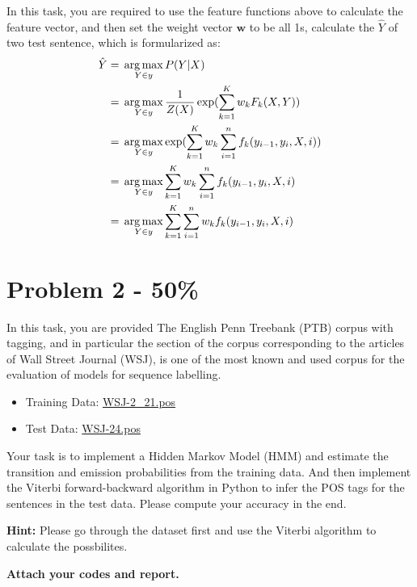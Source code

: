 \documentclass{article}
\begin{document}
In this task, you are required to use the feature functions above to calculate the feature vector,
and then set the weight vector $\mathbf{w}$ to be all 1s,
calculate the $\hat{Y}$ of two test sentence, which is formularized as:
\begin{align}
\hat{Y} &= \sideset{}{}{\arg\max}_{Y \in y}  P(Y|X) \\ &= \sideset{}{}{\arg\max}_{Y \in y} \frac{1}{Z(X)}\exp (\sum_{k = 1}^{K}w_kF_k(X,Y) ) \\ & = \sideset{}{}{\arg\max}_{Y \in y} \exp (\sum_{k = 1}^{K}w_k\sum_{i = 1}^{n}f_k(y_{i-1},y_i,X,i)) \\ & = \sideset{}{}{\arg\max}_{Y \in y} \sum_{k = 1}^{K}w_k\sum_{i = 1}^{n}f_k(y_{i-1},y_i,X,i) \\ & = \sideset{}{}{\arg\max}_{Y \in y} \sum_{k = 1}^{K}\sum_{i = 1}^{n}w_kf_k(y_{i-1},y_i,X,i) 
\end{align}


\section*{Problem 2 - 50\%}

In this task, you are provided The English Penn Treebank (PTB) corpus with tagging, 
and in particular the section of the corpus corresponding 
to the articles of Wall Street Journal (WSJ), 
is one of the most known and used corpus for the evaluation of models for sequence labelling.

\begin{itemize}
    \item Training Data: \href{https://drive.google.com/file/d/16H4D4nsntZVA4sXslWAy2nl8BX_gxofM/view?usp=sharing}{WSJ-2\_21.pos}
    \item Test Data: \href{https://drive.google.com/file/d/1yl_ea9VznZuauavGMLfLHxzcZf2yPil3/view?usp=sharing}{WSJ-24.pos}
\end{itemize}

Your task is to implement a Hidden Markov Model (HMM) and 
estimate the transition and emission probabilities from the training data.
And then implement the Viterbi forward-backward algorithm in Python
to infer the POS tags for the sentences in the test data. Please
compute your accuracy in the end. 

\textbf{Hint:} Please go through the dataset first and use the Viterbi algorithm to calculate the possbilites.

\textbf{Attach your codes and report.}
\end{document}
